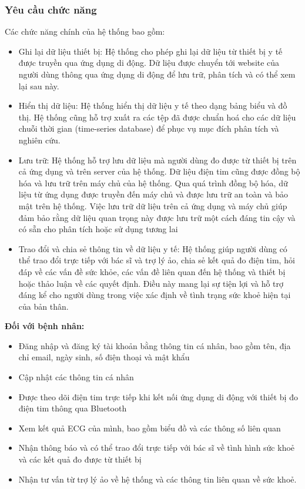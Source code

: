 \subsubsection{Yêu cầu chức năng}
Các chức năng chính của hệ thống bao gồm:
\begin{adjustwidth}{1.5em}{}
  \begin{itemize}
      \item Ghi lại dữ liệu thiết bị: Hệ thống cho phép ghi lại dữ liệu từ thiết bị y tế được truyền qua ứng dụng di động. Dữ liệu được chuyển tới website của người dùng thông qua ứng dụng di động để lưu trữ, phân tích và có thể xem lại sau này.
      \item Hiển thị dữ liệu: Hệ thống hiển thị dữ liệu y tế theo dạng bảng biểu và đồ thị. Hệ thống cũng hỗ trợ xuất ra các tệp đã được chuẩn hoá cho các dữ liệu chuỗi thời gian (time-series database) để phục vụ mục đích phân tích và nghiên cứu.
      \item Lưu trữ: Hệ thống hỗ trợ lưu dữ liệu mà người dùng đo được từ thiết bị trên cả ứng dụng và trên server của hệ thống. Dữ liệu điện tim cũng được đồng bộ hóa và lưu trữ trên máy chủ của hệ thống. Qua quá trình đồng bộ hóa, dữ liệu từ ứng dụng được truyền đến máy chủ và được lưu trữ an toàn và bảo mật trên hệ thống. Việc lưu trữ dữ liệu trên cả ứng dụng và máy chủ giúp đảm bảo rằng dữ liệu quan trọng này được lưu trữ một cách đáng tin cậy và có sẵn cho phân tích hoặc sử dụng tương lai
      \item Trao đổi và chia sẻ thông tin về dữ liệu y tế: Hệ thống giúp người dùng có thể trao đổi trực tiếp với bác sĩ và trợ lý ảo, chia sẻ kết quả đo điện tim, hỏi đáp về các vấn đề sức khỏe, các vấn đề liên quan đến hệ thống và thiết bị hoặc thảo luận về các quyết định. Điều này mang lại sự tiện lợi và hỗ trợ đáng kể cho người dùng trong việc xác định về tình trạng sức khoẻ hiện tại của bản thân.
      

  \end{itemize}
\end{adjustwidth}
\textbf{Đối với bệnh nhân:}
\begin{adjustwidth}{1.5em}{}
\begin{itemize}
    \item Đăng nhập và đăng ký tài khoản bằng thông tin cá nhân, bao gồm tên, địa chỉ email, ngày sinh, số điện thoại và mật khẩu
    \item Cập nhật các thông tin cá nhân
    \item Được theo dõi điện tim trực tiếp khi kết nối ứng dụng di động với thiết bị đo điện tim thông qua Bluetooth
    \item Xem kết quả ECG của mình, bao gồm biểu đồ và các thông số liên quan
    \item Nhận thông báo và có thể trao đổi trực tiếp với bác sĩ về tình hình sức khoẻ và các kết quả đo được từ thiết bị
    \item Nhận tư vấn từ trợ lý ảo về hệ thống và các thông tin liên quan về sức khoẻ.
\end{itemize}
\end{adjustwidth}
